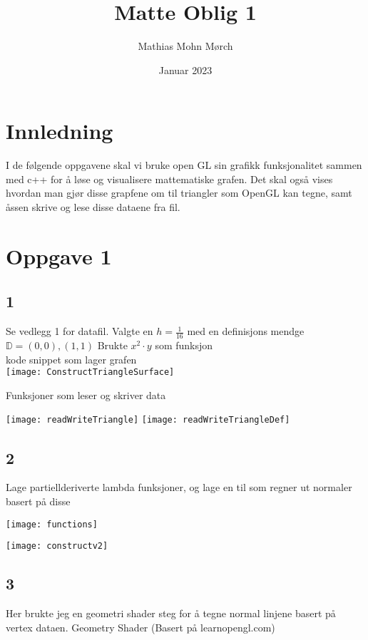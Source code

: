 ﻿\documentclass[14]{article}
\title{Matte Oblig 1}
\author{Mathias Mohn Mørch}
\date{Januar 2023}
\begin{document}
    \maketitle
    \begin{flushleft}
        \graphicspath{{Images/}}

        \section{Innledning}
        I de følgende oppgavene skal vi bruke open GL sin grafikk funksjonalitet sammen med c++ for å løse og visualisere mattematiske grafen.
        Det skal også vises hvordan man gjør disse grapfene om til triangler som OpenGL kan tegne, samt åssen skrive og lese disse dataene fra fil.
        
        
        \section{Oppgave 1}
            \subsection*{1}
        Se vedlegg 1 for datafil.
        Valgte en \(h = \frac{1}{16}\) med en definisjons mendge \(\mathbb{D} = (0,0), (1,1)\)
        Brukte \(x^2\cdot y\) som funksjon\\
        kode snippet som lager grafen\\
        \texttt{[image: ConstructTriangleSurface]}
        
        Funksjoner som leser og skriver data
        
        \texttt{[image: readWriteTriangle]}
        \texttt{[image: readWriteTriangleDef]}
        
        
            \subsection*{2}
        Lage partiellderiverte lambda funksjoner, og lage en til som regner ut normaler basert på disse
        
        \texttt{[image: functions]}
        
        \texttt{[image: constructv2]}
        
            \subsection*{3}
        Her brukte jeg en geometri shader steg for å tegne normal linjene basert på vertex dataen.
        Geometry Shader (Basert på learnopengl.com)
        

\end{flushleft}
\end{document}

